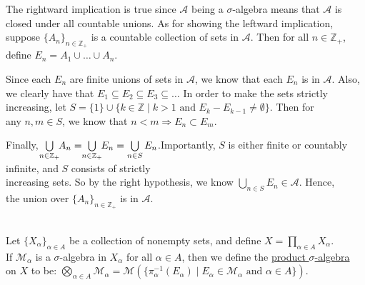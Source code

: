 \documentclass{book}
\newcommand{\hOne}{%
   \color{Black}%
   \fontsize{14}{16}\selectfont%
}
\newcommand{\exTwoP}{%
   \color{RedViolet}%
   \fontsize{13}{15}\selectfont%
}
\newenvironment{myIndent}{%
   \begin{adjustwidth}{2.5em}{0em}%
}{%
   \end{adjustwidth}%
}
\newcommand{\udefine}[1]{{%
   \setulcolor{Red}%
   \setul{0.14em}{0.07em}%
   \ul{#1}%
}}
\newcommand{\mySepTwo}[1][.]{%
   {\noindent\color{#1}{\rule{6.5in}{0.5mm}}}\\%
}
\newcommand{\retTwo}{\hfill\bigbreak}
\begin{document}
\begin{myIndent}\exTwoP
   The rightward implication is true since $\mathcal{A}$ being a $\sigma$-algebra means that $\mathcal{A}$ is\\ closed under all countable unions. As for showing the leftward implication,\\ suppose $\{A_n\}_{n \in \mathbb{Z}_+}$ is a countable collection of sets in $\mathcal{A}$. Then for all $n \in \mathbb{Z}_+$,\\ define $E_n = A_1 \cup \ldots \cup A_n$.\retTwo
   
   Since each $E_n$ are finite unions of sets in $\mathcal{A}$, we know that each $E_n$ is in $\mathcal{A}$. Also,\\ we clearly have that $E_1 \subseteq E_2 \subseteq E_3 \subseteq \ldots$\phantom{a} In order to make the sets strictly\\ increasing, let $S = \{1\} \cup \{k \in \mathbb{Z} \mid k > 1 \text{ and } E_{k} - E_{k-1} \neq \emptyset \}$. Then for\\ any $n, m \in S$, we know that $n < m \Longrightarrow E_n \subset E_m$.\retTwo

   Finally, $\hspace{-0.3em}\bigcup\limits_{n \in \mathbb{Z}_+}\hspace{-0.3em} A_n = \hspace{-0.3em}\bigcup\limits_{n \in \mathbb{Z}_+}\hspace{-0.3em} E_n = \bigcup\limits_{n \in S}E_n$.\retTwo Importantly, $S$ is either finite or countably infinite, and $S$ consists of strictly\\ increasing sets. So by the right hypothesis, we know $\bigcup\limits_{n \in S}E_n \in \mathcal{A}$. Hence,\\ [-9pt] the union over $\{A_n\}_{n \in \mathbb{Z}_+}$ is in $\mathcal{A}$. \retTwo
\end{myIndent}

\hOne
\mySepTwo

Let $\{X_\alpha\}_{\alpha \in A}$ be a collection of nonempty sets, and define $X = \prod\limits_{\alpha \in A}X_\alpha$.\\ If $\mathcal{M}_\alpha$ is a $\sigma$-algebra in $X_\alpha$ for all $\alpha \in A$, then we define the \udefine{product $\sigma$-algebra}\\ on $X$ to be: $\bigotimes\limits_{\alpha \in A}\mathcal{M}_\alpha = \mathcal{M}(\{\pi_\alpha^{-1}(E_\alpha) \mid E_\alpha \in \mathcal{M}_\alpha \text{ and } \alpha \in A\})$.\retTwo
\end{document}
